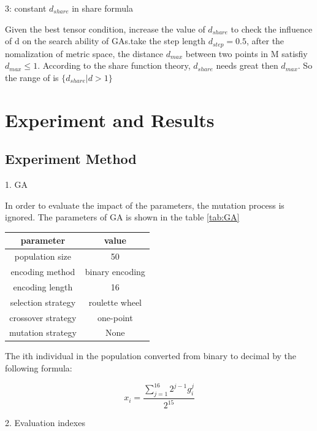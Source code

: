 \documentclass[smallextended]{svjour3}       %
\begin{document}
\begin{multicols}{2}
3: constant $d_{share}$ in share formula


Given the best tensor condition, increase the value of $d_{share}$ to check the
influence of d on the search ability of GAs.take the step length $d_{step}=0.5$,
after the nomalization of metric space, the distance $d_{max}$ between two
points in M satisfiy $d_{max}\leq 1$. According to the share function theory,
$d_{share}$ needs great then $d_{max}$. So the range of is $\{d_{share}|d > 1\}$

 


\section{Experiment and Results}

\subsection{Experiment Method}
1. GA

In order to evaluate the impact of the parameters, the mutation process is
ignored. The parameters of GA is shown in the table \ref{tab:GA}

\begin{center}
\begin{tabular}{cc}
	\toprule
	parameter & value \\
	\midrule
	population size      & 50 \\
    encoding method      & binary encoding\\
    encoding length      & 16 \\
	selection strategy   & roulette wheel  \\
	crossover strategy   & one-point \\
	mutation strategy    & None \\
	\bottomrule
\end{tabular}
\label{tab:GA}
\end{center}


The ith individual in the population converted  from binary to decimal by the
following formula:

\begin{equation}
x_i=\frac{\sum_{j=1}^{16}2^{j-1}g_i^j}{2^{15}}
\end{equation}


2. Evaluation indexes


\end{multicols}
\end{document}
